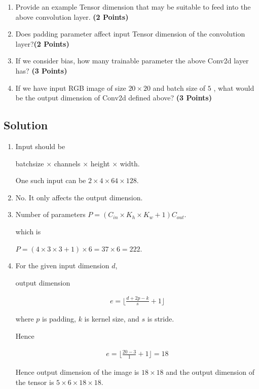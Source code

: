 \documentclass[12pt, xcolor=dvipsnames,svgnames,x11names]{article}
\begin{document}
\begin{enumerate}
\item Provide an example Tensor dimension that may be suitable to feed into the above convolution layer. \hfill \textbf{(2 Points)}

\item Does padding parameter affect input Tensor dimension of the convolution layer?\hfill \textbf{(2 Points)} 

\item If we consider bias, how many trainable parameter the above Conv2d layer has? \hfill \textbf{(3 Points)}

\item If we have input RGB image of size $20\times 20$ and batch size of $5$ , what would be the output dimension of Conv2d defined above? \hfill \textbf{(3 Points)}


\end{enumerate}

\subsection{Solution}


\begin{enumerate}
\item 

Input should be 

batchsize $\times$ channels $\times$ height $\times$ width.

One such input can be  $ 2\times 4 \times 64 \times 128$.


\item No. It only affects the output dimension.


\item Number of parameters $ P = (C_{in} \times K_{h} \times K_{w}  + 1)C_{out}$.

which is 

$ P  = (4 \times 3 \times 3 + 1) \times 6 = 37 \times 6 = 222$.

\item 

For the given input dimension $d$, 

output dimension 

\begin{align*}
e = \bigg\lfloor{\frac{d  + 2p - k}{s}  + 1 }\bigg\rfloor
\end{align*}

where $p$ is padding, $k$ is kernel size, and $s$ is stride.

Hence

\begin{align*}
e = \bigg\lfloor{\frac{20   - 3}{1}  + 1 }\bigg\rfloor = 18
\end{align*}

Hence output dimension of the image is $18 \times 18$ and the output dimension of the tensor is  $ 5 \times 6 \times 18 \times 18 $.

\end{enumerate}
\end{document}
